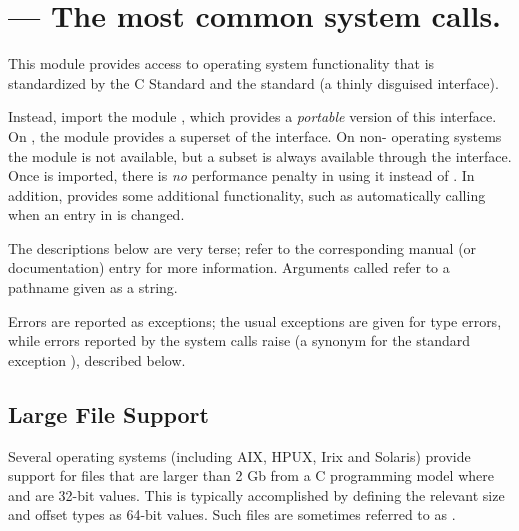 \section{ ---
         The most common \POSIX{} system calls.}



This module provides access to operating system functionality that is
standardized by the C Standard and the \POSIX{} standard (a thinly
disguised \UNIX{} interface).

  Instead, import the
module , which provides a \emph{portable} version of this
interface.  On \UNIX{}, the  module provides a superset of
the  interface.  On non-\UNIX{} operating systems the
 module is not available, but a subset is always
available through the  interface.  Once  is
imported, there is \emph{no} performance penalty in using it instead
of .  In addition, 
provides some additional functionality, such as automatically calling
 when an entry in  is changed.

The descriptions below are very terse; refer to the corresponding
\UNIX{} manual (or \POSIX{} documentation) entry for more information.
Arguments called  refer to a pathname given as a string.

Errors are reported as exceptions; the usual exceptions are given for
type errors, while errors reported by the system calls raise
 (a synonym for the standard exception
), described below.


\subsection{Large File Support \label{posix-large-files}}


Several operating systems (including AIX, HPUX, Irix and Solaris)
provide support for files that are larger than 2 Gb from a C
programming model where  and  are 32-bit
values. This is typically accomplished by defining the relevant size
and offset types as 64-bit values. Such files are sometimes referred
to as .

